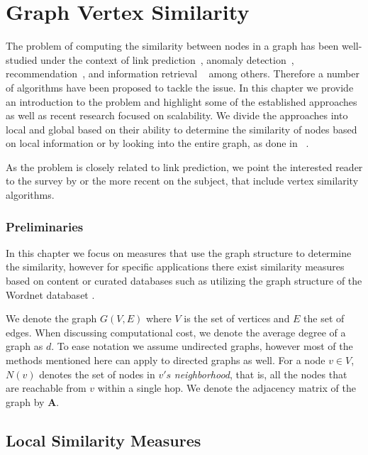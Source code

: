 \chapter{Graph Vertex Similarity}
\label{ch:bg-graph-similarity}

The problem of computing the similarity between nodes in a graph has been
well-studied under the context of link prediction~\cite{link-prediction-survey},
anomaly detection~\cite{graphsim-anomaly},
recommendation~\cite{graphsim-recommendation}, and information retrieval
~\cite{graphsim-retrieval} among others. Therefore a
number of algorithms have been proposed to tackle the issue.
In this chapter we provide an introduction to the problem and
highlight some of the established approaches as well as recent
research focused on scalability. We divide the approaches into local
and global based on their ability to determine the similarity of nodes
based on local information or by looking into the entire graph, as done in
~\cite{link-prediction-survey}.

As the problem is closely related to link prediction, we point the interested reader to
the survey by \citet{link-prediction-survey} or the more
recent \cite{link-prediction-survey-2017} on the subject,
that include vertex similarity algorithms.

\subsection*{Preliminaries}

In this chapter we focus on
measures that use the graph structure to determine the similarity,
however for specific applications there exist similarity measures
based on content or curated databases such as utilizing the graph
structure of the Wordnet databaset \cite{wordnet-similarity, wordnet-relatedness, wordsim}.

We denote the graph $G(V, E)$ where $V$ is the set of vertices and $E$ the set
of edges. When discussing computational cost, we denote the average degree of a graph as $d$.
To ease notation we assume undirected graphs, however most of the methods
mentioned here can apply to directed graphs as well.
For a node $v \in V$, $N(v)$ denotes the set of nodes in $v's$ \emph{neighborhood},
that is, all the nodes that are reachable from $v$ within a single hop.
We denote the adjacency matrix of the graph by $\mathbf{A}$.


\section{Local Similarity Measures}

